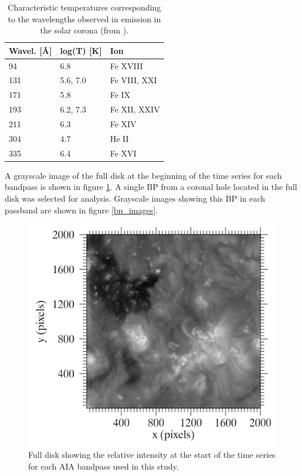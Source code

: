 \documentclass[preprint2]{aastex}
\begin{document}
\begin{table}[h]
\centering
    \begin{tabular}{l l l}
        \hline\hline
        Wavel. [\AA{}] & log(T) [K] & Ion \\
        \hline
        94 & 6.8 & Fe {\small XVIII} \\
        131 & 5.6, 7.0 & Fe {\small VIII, XXI} \\
        171 & 5.8 & Fe {\small IX} \\
        193 & 6.2, 7.3 & Fe {\small XII, XXIV} \\
        211 & 6.3 & Fe {\small XIV} \\
        304 & 4.7 & He {\small II} \\
        335 & 6.4 & Fe {\small XVI} \\
    \end{tabular}
\caption{Characteristic temperatures corresponding to the wavelengths observed
    in emission in the solar corona (from \cite{Lemen}).}
\label{temps}
\end{table}

A grayscale image of the full disk at the beginning of the time series for each
bandpass is shown in figure \ref{full}.
A single BP from a coronal hole located in the full disk was selected for analysis.
Grayscale images showing this BP in each passband are shown in figure \ref{bp_images}.

\begin{figure}[htb!]
    \includegraphics[width=\textwidth]{Figures/full.png}
    \caption{Full disk showing the relative intensity at the start of the time
        series for each AIA bandpass used in this study.}
    \label{full}
\end{figure}
\end{document}
